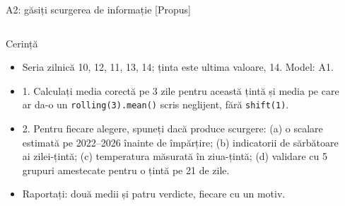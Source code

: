 \begin{frame}{A2: găsiți scurgerea de informație [Propus]}
\propsub
\itemsize{\scriptsize}
\begin{columns}[T]
\begin{column}{\taskw}
\begin{block}{Cerință}
\begin{itemize}
    \item Seria zilnică 10, 12, 11, 13, 14; ținta este ultima valoare, 14. Model: A1.
    \item 1. Calculați media corectă pe 3 zile pentru această țintă și media pe care ar da-o un \texttt{rolling(3).mean()} scris neglijent, fără \texttt{shift(1)}.
    \item 2. Pentru fiecare alegere, spuneți dacă produce scurgere: (a) o scalare estimată pe 2022--2026 înainte de împărțire; (b) indicatorii de sărbătoare ai zilei-țintă; (c) temperatura măsurată în ziua-țintă; (d) validare cu 5 grupuri amestecate pentru o țintă pe 21 de zile.
    \item Raportați: două medii și patru verdicte, fiecare cu un motiv.
\end{itemize}
\end{block}
\end{column}
\begin{column}{\solw}
\end{column}
\end{columns}
\end{frame}

